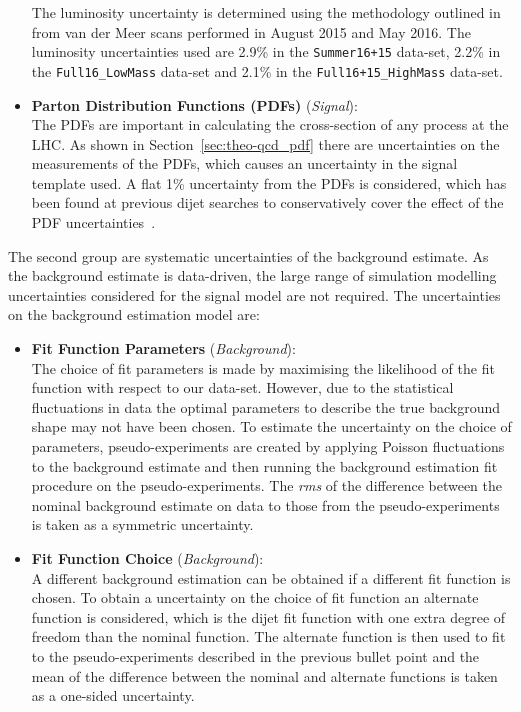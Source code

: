 \begin{itemize}[leftmargin=*]
  The luminosity uncertainty is determined using the methodology outlined in~\cite{lim-syst_lumi}
  from van der Meer scans performed in August 2015 and May 2016.
  The luminosity uncertainties used are 2.9\% in the \verb|Summer16+15| data-set,
  2.2\% in the \verb|Full16_LowMass| data-set
  and 2.1\% in the \verb|Full16+15_HighMass| data-set.
  \vspace{0.5em}
\item\textbf{Parton Distribution Functions (PDFs) } \hspace{1mm}  (\textit{Signal}):\\
  The PDFs are important in calculating the cross-section of any process at the LHC.
  As shown in Section~\ref{sec:theo-qcd_pdf} there are uncertainties on the measurements of the PDFs,
  which causes an uncertainty in the signal template used.
  A flat 1\% uncertainty from the PDFs is considered,
  which has been found at previous dijet searches to conservatively cover
  the effect of the PDF uncertainties~\cite{dijet-mori16_paper}.
  \vspace{0.5em}
\end{itemize}

The second group are systematic uncertainties of the background estimate.
As the background estimate is data-driven,
the large range of simulation modelling uncertainties considered for the signal model are not required.
The uncertainties on the background estimation model are:

\begin{itemize}[leftmargin=*]
\item \textbf{Fit Function Parameters} \hspace{1mm} (\textit{Background}):\\
  The choice of fit parameters is made by maximising the likelihood of the fit function with respect to our data-set.
  However, due to the statistical fluctuations in data the optimal parameters to describe
  the true background shape may not have been chosen.
  To estimate the uncertainty on the choice of parameters, pseudo-experiments are created by applying Poisson
  fluctuations to the background estimate and then running the background estimation fit procedure on the pseudo-experiments.
  The \textit{rms} of the difference between the nominal background estimate on data to those from the pseudo-experiments is
  taken as a symmetric uncertainty. \vspace{0.5em}
\item\textbf{Fit Function Choice}  \hspace{1mm} (\textit{Background}):\\
  A different background estimation can be obtained if a different fit function is chosen.
  To obtain a uncertainty on the choice of fit function an alternate function is considered,
  which is the dijet fit function with one extra degree of freedom than the nominal function.
  The alternate function is then used to fit to the pseudo-experiments described in the previous bullet point
  and the mean of the difference between the nominal and alternate functions is taken as a one-sided uncertainty.
  \vspace{0.5em}
\end{itemize}

